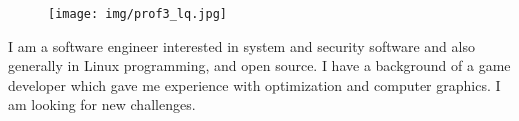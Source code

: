 \documentclass{mycv}
\begin{document}
\begin{paracol}{3}


  \begin{figure}[h!]
    \centering
    \texttt{[image: img/prof3\_lq.jpg]}
  \end{figure}

  \vspace{1cm}


\vspace{10mm}


{\small{
    I am a software engineer interested in system and security software and also generally in Linux programming, and open source. I have a background of a game developer which gave me experience with optimization and computer graphics. I am looking for new challenges.
  }
}


\end{paracol}
\end{document}
